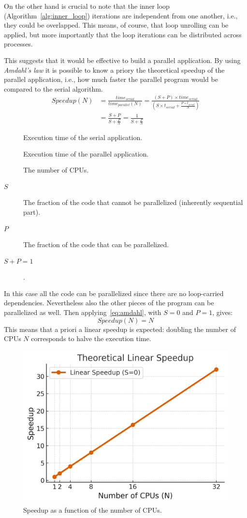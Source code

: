 \documentclass{article}
\begin{document}
On the other hand is crucial to note that the inner loop (Algorithm~\ref{alg:inner_loop}) iterations are independent from one another, i.e., they could be overlapped.
This means, of course, that loop unrolling can be applied, but more importantly that the loop iterations can be distributed across processes.

This suggests that it would be effective to build a parallel application.
By using \emph{Amdahl’s law} it is possible to know a priory the theoretical speedup of the parallel application, i.e., how much faster the parallel program would be compared to the serial algorithm.
\begin{equation}
\begin{aligned}
Speedup(N) &= \frac{time_{serial}}{time_{parallel}(N)}=\frac{(S+P)\times time_{serial}}{(S\times t_{serial}+\frac{P\times t_{serial}}{N})} \\ &=\frac{S+P}{S+\frac{P}{N}}=\frac{1}{S+\frac{P}{N}}
\end{aligned}
\label{eq:amdahl}
\end{equation}
\begin{description}
    \item[] Execution time of the serial application.
    \item[] Execution time of the parallel application.
    \item[] The number of CPUs.
    \item[\( S \)] The fraction of the code that cannot be parallelized (inherently sequential part).
    \item[\( P \)] The fraction of the code that can be parallelized.
    \item[\( S + P = 1 \)].
\end{description}
In this case all the code can be parallelized since there are no loop-carried dependencies. Nevertheless also the other pieces of the program can be parallelized as well.
Then applying~\eqref{eq:amdahl}, with $S=0$ and $P=1$, gives:
\begin{equation}
Speedup(N)=N
\label{eq:speedup}
\end{equation}
This means that a priori a linear speedup is expected: doubling the number of CPUs $N$ corresponds to halve the execution time.
\begin{figure}[H]
    \centering
    \includegraphics[width=0.6\linewidth]{linear_speedup.png}
    \caption{Speedup as a function of the number of CPUs.}
    \label{fig:linear_speedup}
\end{figure}
\end{document}
